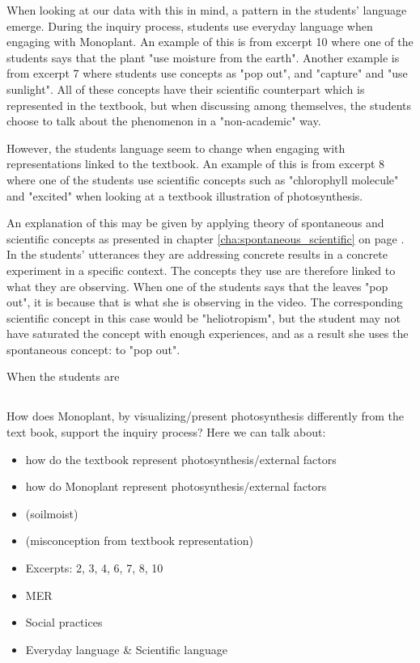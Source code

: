 When looking at our data with this in mind, a pattern in the students' language emerge. During the inquiry process, students use everyday language when engaging with Monoplant. An example of this is from excerpt 10 where one of the students says that the plant "use moisture from the earth". Another example is from excerpt 7 where students use concepts as "pop out", and "capture" and "use sunlight". All of these concepts have their scientific counterpart which is represented in the textbook, but when discussing among themselves, the students choose to talk about the phenomenon in a "non-academic" way. 

However, the students language seem to change when engaging with representations linked to the textbook. An example of this is from excerpt 8 where one of the students use scientific concepts such as "chlorophyll molecule" and "excited" when looking at a textbook illustration of photosynthesis. 

An explanation of this may be given by applying \citet{vygotsky2012thought} theory of spontaneous and scientific concepts as presented in chapter \ref{cha:spontaneous_scientific} on page \pageref{cha:spontaneous_scientific}. In the students' utterances they are addressing concrete results in a concrete experiment in a specific context. The concepts they use are therefore linked to what they are observing. When one of the students says that the leaves "pop out", it is because that is what she is observing in the video. The corresponding scientific concept in this case would be "heliotropism", but the student may not have saturated the concept with enough experiences, and as a result she uses the spontaneous concept: to "pop out". 


When the students are 



\subsection{} 


How does Monoplant, by visualizing/present photosynthesis differently from the text book, support the inquiry process? 
Here we can talk about: 
\begin{itemize}
\item{how do the textbook represent photosynthesis/external factors}
\item{how do Monoplant represent photosynthesis/external factors}
\item{ (soilmoist)}
\item{ (misconception from textbook representation)}
\item{Excerpts: 2, 3, 4, 6, 7, 8, 10}
\item{MER}
\item{Social practices}
\item{Everyday language \& Scientific language}
\end{itemize}




